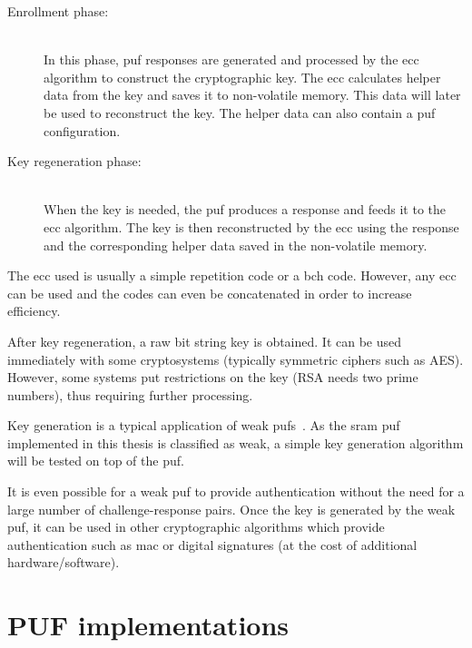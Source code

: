 \begin{description}
    \item[Enrollment phase:] \hfill \\ In this phase, \gls{puf} responses are generated and processed by the \gls{ecc} algorithm to construct the cryptographic key. The \gls{ecc} calculates helper data from the key and saves it to non-volatile memory. This data will later be used to reconstruct the key. The helper data can also contain a \gls{puf} configuration.
    \item[Key regeneration phase:] \hfill \\ When the key is needed, the \gls{puf} produces a response and feeds it to the \gls{ecc} algorithm. The key is then reconstructed by the \gls{ecc} using the response and the corresponding helper data saved in the non-volatile memory.
\end{description}

The \gls{ecc} used is usually a simple repetition code or a \gls{bch} code. However, any \gls{ecc} can be used and the codes can even be concatenated in order to increase efficiency.~\cite{Bosch2008}

After key regeneration, a raw bit string key is obtained. It can be used immediately with some cryptosystems (typically symmetric ciphers such as AES). However, some systems put restrictions on the key (RSA needs two prime numbers), thus requiring further processing. %

Key generation is a typical application of weak \glspl{puf}~\cite{Herder2014}. As the \gls{sram} \gls{puf} implemented in this thesis is classified as weak, a simple key generation algorithm will be tested on top of the \gls{puf}.

It is even possible for a weak \gls{puf} to provide authentication without the need for a large number of challenge-response pairs. Once the key is generated by the weak \gls{puf}, it can be used in other cryptographic algorithms which provide authentication such as \gls{mac} or digital signatures (at the cost of additional hardware/software).~\cite{Herder2014}



\section{PUF implementations}

